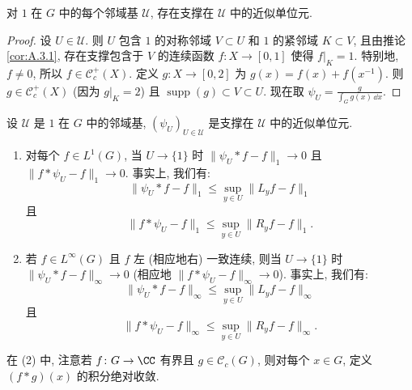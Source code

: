\begin{proposition}[近似单位元的存在性]
\label{prop:I.4.1.8}
对 $1$ 在 $G$ 中的每个邻域基 $\mathcal{U}$, 存在支撑在 $\mathcal{U}$ 中的近似单位元.
\end{proposition}

\begin{proof}
设 $U \in \mathcal{U}$. 则 $U$ 包含 $1$ 的对称邻域 $V \subset U$ 和 $1$ 的紧邻域 $K \subset V$, 且由推论 \ref{cor:A.3.1}, 存在支撑包含于 $V$ 的连续函数 $f \colon X \to [0, 1]$ 使得 $f|_K = 1$. 特别地, $f \neq 0$, 所以 $f \in \mathcal{C}_c^+(X)$. 定义 $g \colon X \to [0, 2]$ 为 $g(x) = f(x) + f(x^{-1})$. 则 $g \in \mathcal{C}_c^+(X)$ (因为 $g|_K = 2$) 且 $\operatorname{supp}(g) \subset V \subset U$. 现在取 $\psi_U = \frac{g}{\int_G g(x)\,\dd x}$.
\end{proof}

\begin{proposition}[近似单位元的逼近性质]
\label{prop:I.4.1.9}
设 $\mathcal{U}$ 是 $1$ 在 $G$ 中的邻域基, $(\psi_U)_{U \in \mathcal{U}}$ 是支撑在 $\mathcal{U}$ 中的近似单位元.
\begin{enumerate}
\item[(1)] 对每个 $f \in L^1(G)$, 当 $U \to \{1\}$ 时 $\|\psi_U * f - f\|_1 \to 0$ 且 $\|f * \psi_U - f\|_1 \to 0$. 事实上, 我们有:
\[
\|\psi_U * f - f\|_1 \leq \sup_{y \in U}\|L_yf - f\|_1
\]
且
\[
\|f * \psi_U - f\|_1 \leq \sup_{y \in U}\|R_yf - f\|_1.
\]
\item[(2)] 若 $f \in L^{\infty}(G)$ 且 $f$ 左 (相应地右) 一致连续, 则当 $U \to \{1\}$ 时 $\|\psi_U * f - f\|_{\infty} \to 0$ (相应地 $\|f * \psi_U - f\|_{\infty} \to 0$). 事实上, 我们有:
\[
\|\psi_U * f - f\|_{\infty} \leq \sup_{y \in U}\|L_yf - f\|_{\infty}
\]
且
\[
\|f * \psi_U - f\|_{\infty} \leq \sup_{y \in U}\|R_yf - f\|_{\infty}.
\]
\end{enumerate}
\end{proposition}

在 (2) 中, 注意若 $f \colon G \to \CC$ 有界且 $g \in \mathcal{C}_c(G)$, 则对每个 $x \in G$, 定义 $(f * g)(x)$ 的积分绝对收敛.

